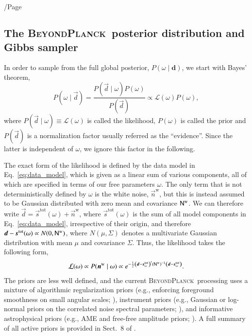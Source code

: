 /Page\documentclass[twocolumn]{aa}
\renewcommand{\d}[0]{\vec{d}}
\newcommand{\n}[0]{\vec{n}}
\newcommand{\s}[0]{\vec{s}}
\newcommand{\N}[0]{\tens{N}}
\newcommand{\BP}{\textsc{BeyondPlanck}}
\begin{document}
\subsection{The \BP\ posterior distribution and Gibbs sampler}

In order to sample from the full global posterior, $P(\omega
\mid\mathbf{d})$, we start with Bayes' theorem,
\begin{equation}
  \label{eq:bayes}
  P(\omega\mid\d)=\frac{P(\d\mid\omega)P(\omega)}{P(\d)}
  \propto \mathcal{L}(\omega)P(\omega),
\end{equation}
where $P(\d\mid\omega)\equiv\mathcal{L}(\omega)$ is called the
likelihood, $P(\omega)$ is called the prior and $P(\d)$ is a
normalization factor usually referred as the ``evidence''. Since the
latter is independent of $\omega$, we ignore this factor in the
following.

The exact form of the likelihood is defined by the data model in
Eq.~\eqref{eq:data_model}, which is given as a linear sum of various
components, all of which are specified in terms of our free parameters
$\omega$. The only term that is not deterministically defined by
$\omega$ is the white noise, $\n^{\mathrm{w}}$, but this is instead
assumed to be Gaussian distributed with zero mean and covariance
$\N^{\mathrm{w}}$. We can therefore write
$\d=\s^{\mathrm{tot}}(\omega)+\n^\mathrm{w}$, where
$\s^{\mathrm{tot}}(\omega)$ is the sum of all model components in
Eq.~\eqref{eq:data_model}, irrespective of their origin, and therefore
$\d-\s^{\mathrm{tot}}(\omega) \propto N(0,\N^{\mathrm{w}})$, where
$N(\mu,\Sigma)$ denotes a multivariate Gaussian distribution with mean
$\mu$ and covariance $\Sigma$. Thus, the likelihood takes the
following form,
\begin{equation}
  \label{eq:bp_like}
  \mathcal{L}(\omega)\propto P(\n^\mathrm{w}\mid\omega)\propto
  e^{-\frac{1}{2}\left(\d-\s^{\mathrm{tot}}_\omega\right)^t(\N^{\mathrm{w}})^{-1}
  \left(\d-\s^{\mathrm{tot}}_\omega\right)}.
\end{equation}
The priors are less well defined, and the current \BP\ processing uses
a mixture of algorithmic regularization priors (e.g., enforcing
foreground smoothness on small angular scales; \citealp{bp13}),
instrument priors (e.g., Gaussian or log-normal priors on the
correlated noise spectral parameters; \citealp{bp06}), and informative
astrophysical priors (e.g., AME and free-free amplitude priors;
\citealp{bp13,bp11}). A full summary of all active priors is provided in
Sect.~8 of \citet{bp01}.
\end{document}
